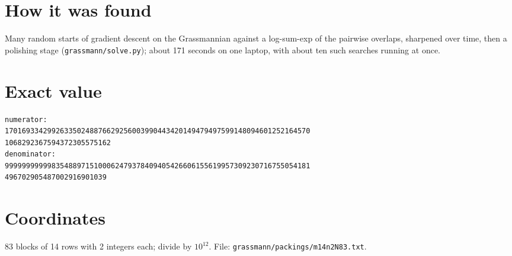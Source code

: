 \documentclass[11pt,a4paper]{article}
\begin{document}
\section{How it was found}
Many random starts of gradient descent on the Grassmannian against a log-sum-exp of the pairwise overlaps, sharpened over time, then a polishing stage (\texttt{grassmann/solve.py}); about 171 seconds on one laptop, with about ten such searches running at once.


\appendix
\section{Exact value}
{\small
\begin{verbatim}
numerator:
170169334299263350248876629256003990443420149479497599148094601252164570
1068292367594372305575162
denominator:
999999999998354889715100062479378409405426606155619957309230716755054181
496702905487002916901039
\end{verbatim}}

\section{Coordinates}
83 blocks of 14 rows with 2 integers each; divide by $10^{12}$. File: \texttt{grassmann/packings/m14n2N83.txt}.
{\tiny
\begin{multicols}{4}
\end{multicols}}
\end{document}
